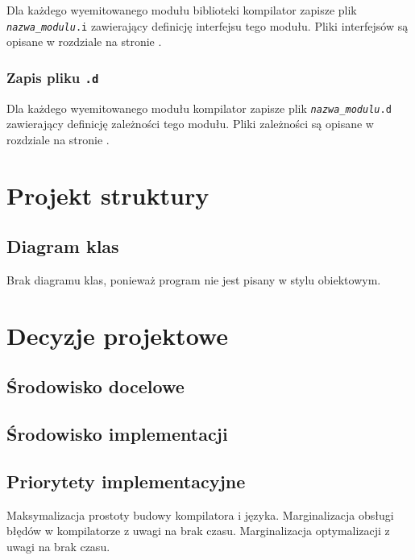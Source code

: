 \documentclass[11pt,oneside,a4paper,titlepage,onecolumn]{article}
\begin{document}
Dla każdego wyemitowanego modułu biblioteki kompilator zapisze plik \texttt{\emph{nazwa\_modulu}.i}
zawierający definicję interfejsu tego modułu. Pliki interfejsów są opisane w rozdziale
 na stronie \pageref{pliki_interfejsow_modulow}.

\subsubsection{Zapis pliku \texttt{.d}}

Dla każdego wyemitowanego modułu kompilator zapisze plik \texttt{\emph{nazwa\_modulu}.d}
zawierający definicję zależności tego modułu. Pliki zależności są opisane w rozdziale
 na stronie \pageref{pliki_zaleznosci_modulow}.

\newpage

\section{Projekt struktury}

\subsection{Diagram klas}

Brak diagramu klas, ponieważ program nie jest pisany w stylu obiektowym.

\section{Decyzje projektowe}

\subsection{Środowisko docelowe}

\subsection{Środowisko implementacji}

\subsection{Priorytety implementacyjne}

Maksymalizacja prostoty budowy kompilatora i języka.
Marginalizacja obsługi błędów w kompilatorze z uwagi na brak czasu.
Marginalizacja optymalizacji z uwagi na brak czasu.
\end{document}
